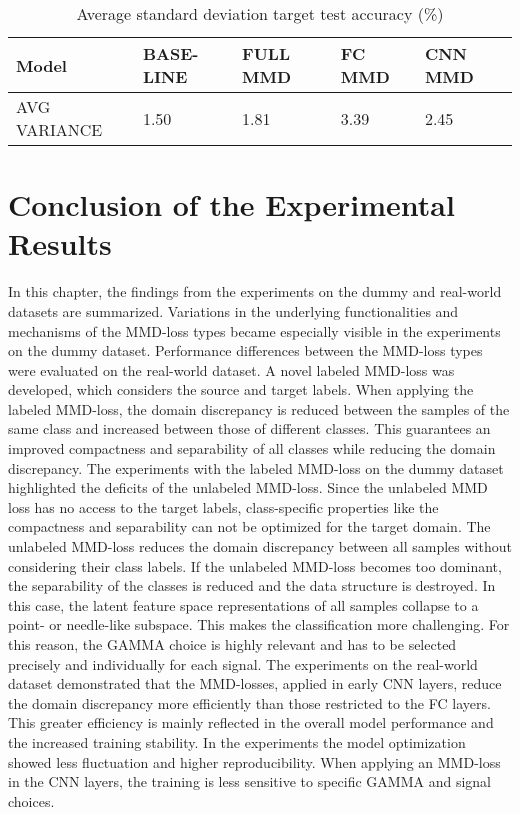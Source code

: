 \begin {table}[H]
\centering
\begin{tabular}{lllll}
  \toprule
  Model & BASE-LINE & FULL MMD & FC MMD & CNN MMD\\
  \midrule
  AVG VARIANCE & 1.50 & 1.81 & 3.39 & 2.45\\
  \bottomrule
\end{tabular}
\caption {Average standard deviation target test accuracy (\%)} \label{tab:Average_Variance_Accuracy} 
\end {table}

\section{Conclusion of the Experimental Results}\label{sec:Performance_overview}
In this chapter, the findings from the experiments on the dummy and real-world datasets are summarized. Variations in the underlying functionalities and mechanisms of the MMD-loss types became especially visible in the experiments on the dummy dataset. Performance differences between the MMD-loss types were evaluated on the real-world dataset. A novel labeled MMD-loss was developed, which considers the source and target labels. When applying the labeled MMD-loss, the domain discrepancy is reduced between the samples of the same class and increased between those of different classes. This guarantees an improved compactness and separability of all classes while reducing the domain discrepancy. The experiments with the labeled MMD-loss on the dummy dataset highlighted the deficits of the unlabeled MMD-loss. Since the unlabeled MMD loss has no access to the target labels, class-specific properties like the compactness and separability can not be optimized for the target domain. The unlabeled MMD-loss reduces the domain discrepancy between all samples without considering their class labels. If the unlabeled MMD-loss becomes too dominant, the separability of the classes is reduced and the data structure is destroyed. In this case, the latent feature space representations of all samples collapse to a point- or needle-like subspace. This makes the classification more challenging. For this reason, the GAMMA choice is highly relevant and has to be selected precisely and individually for each signal. The experiments on the real-world dataset demonstrated that the MMD-losses, applied in early CNN layers, reduce the domain discrepancy more efficiently than those restricted to the FC layers. This greater efficiency is mainly reflected in the overall model performance and the increased training stability. In the experiments the model optimization showed less fluctuation and higher reproducibility. When applying an MMD-loss in the CNN layers, the training is less sensitive to specific GAMMA and signal choices. 